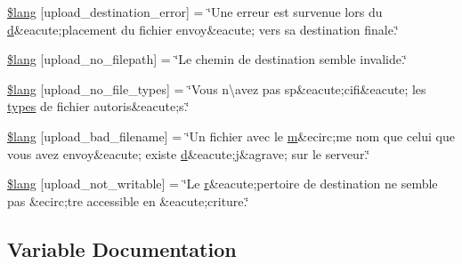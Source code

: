 \begin{DoxyCompactItemize}
\item 
\hyperlink{application_2language_2french_2upload__lang_8php_a31be70c748b9bfc43dd7468e1fa64c42}{\$lang} \mbox{[}\textquotesingle{}upload\+\_\+destination\+\_\+error\textquotesingle{}\mbox{]} = \char`\"{}Une erreur est survenue lors du \hyperlink{fullpage_2plugin_8min_8js_a86138ad7596633fd5f960ad9c40f8862}{d}\&eacute;placement du fichier envoy\&eacute; vers sa destination finale.\char`\"{}
\item 
\hyperlink{application_2language_2french_2upload__lang_8php_a3c17908c53072c6a5ef593760aaaa704}{\$lang} \mbox{[}\textquotesingle{}upload\+\_\+no\+\_\+filepath\textquotesingle{}\mbox{]} = \char`\"{}Le chemin de destination semble invalide.\char`\"{}
\item 
\hyperlink{application_2language_2french_2upload__lang_8php_ab188c98e583c81905dedaad54ad452bb}{\$lang} \mbox{[}\textquotesingle{}upload\+\_\+no\+\_\+file\+\_\+types\textquotesingle{}\mbox{]} = \char`\"{}Vous n\textbackslash{}\textquotesingle{}avez pas sp\&eacute;cifi\&eacute; les \hyperlink{_chart_8_core_8js_a0ecd014dd4c5d61d8130961daf1eed54}{types} de fichier autoris\&eacute;s.\char`\"{}
\item 
\hyperlink{application_2language_2french_2upload__lang_8php_abb379322384f3f35952a539c63e2c8f7}{\$lang} \mbox{[}\textquotesingle{}upload\+\_\+bad\+\_\+filename\textquotesingle{}\mbox{]} = \char`\"{}Un fichier avec le \hyperlink{_chart_8min_8js_a9e77e016b2928d7dcb493b89a0c9dc32}{m}\&ecirc;me nom que celui que vous avez envoy\&eacute; existe \hyperlink{fullpage_2plugin_8min_8js_a86138ad7596633fd5f960ad9c40f8862}{d}\&eacute;j\&agrave; sur le serveur.\char`\"{}
\item 
\hyperlink{application_2language_2french_2upload__lang_8php_aed6bfb5a9094179427f61fcbb582145b}{\$lang} \mbox{[}\textquotesingle{}upload\+\_\+not\+\_\+writable\textquotesingle{}\mbox{]} = \char`\"{}Le \hyperlink{jquery-1_811_81_8min_8js_a96f65b399314d93896076ceb474b6b9b}{r}\&eacute;pertoire de destination ne semble pas \&ecirc;tre accessible en \&eacute;criture.\char`\"{}
\end{DoxyCompactItemize}


\subsection{Variable Documentation}
